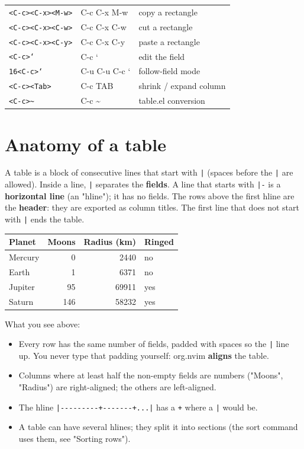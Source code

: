 \begin{center}
\begin{tabular}{lll}
\texttt{<C-c><C-x><M-w>} & C-c C-x M-w & copy a rectangle\\
\texttt{<C-c><C-x><C-w>} & C-c C-x C-w & cut a rectangle\\
\texttt{<C-c><C-x><C-y>} & C-c C-x C-y & paste a rectangle\\
\texttt{<C-c>`} & C-c ` & edit the field\\
\texttt{16<C-c>`} & C-u C-u C-c ` & follow-field mode\\
\texttt{<C-c><Tab>} & C-c TAB & shrink / expand column\\
\texttt{<C-c>\textasciitilde{}} & C-c \textasciitilde{} & table.el conversion\\
\end{tabular}
\end{center}
\section{Anatomy of a table}
\label{sec:org3d780a4}
A table is a block of consecutive lines that start with \texttt{|} (spaces before
the \texttt{|} are allowed). Inside a line, \texttt{|} separates the \textbf{fields}. A line
that starts with \texttt{|-} is a \textbf{horizontal line} (an "hline"); it has no fields.
The rows above the first hline are the \textbf{header}: they are exported as
column titles. The first line that does not start with \texttt{|} ends the table.

\begin{table}[htbp]
\label{tab:orge87d85b}
\centering
\begin{tabular}{lrrl}
Planet & Moons & Radius (km) & Ringed\\
\hline
Mercury & 0 & 2440 & no\\
Earth & 1 & 6371 & no\\
Jupiter & 95 & 69911 & yes\\
Saturn & 146 & 58232 & yes\\
\end{tabular}
\end{table}

What you see above:

\begin{itemize}
\item Every row has the same number of fields, padded with spaces so the \texttt{|}
line up. You never type that padding yourself: org.nvim \textbf{aligns} the
table.
\item Columns where at least half the non-empty fields are numbers
("Moons", "Radius") are right-aligned; the others are left-aligned.
\item The hline \texttt{|-{}-{}-{}-{}-{}-{}-{}-{}-+-{}-{}-{}-{}-{}-{}-+...|} has a \texttt{+} where a \texttt{|} would be.
\item A table can have several hlines; they split it into sections (the sort
command uses them, see "Sorting rows").
\end{itemize}

